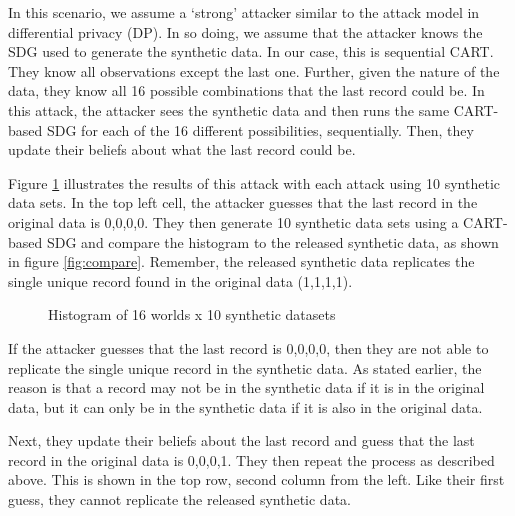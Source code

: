 \documentclass[runningheads]{llncs}
\begin{document}
In this scenario, we assume a `strong' attacker similar to the attack model in differential privacy (DP).  In so doing, we assume that the attacker knows the SDG used to generate the synthetic data.  In our case, this is sequential CART.  They know all observations except the last one.  Further, given the nature of the data, they know all 16 possible combinations that the last record could be.  In this attack, the attacker sees the synthetic data and then runs the same CART-based SDG for each of the 16 different possibilities, sequentially.  Then, they update their beliefs about what the last record could be.

Figure \ref{fig:attacker_default} illustrates the results of this attack with each attack using 10 synthetic data sets.  In the top left cell, the attacker guesses that the last record in the original data is 0,0,0,0.  They then generate 10 synthetic data sets using a CART-based SDG and compare the histogram to the released synthetic data, as shown in figure \ref{fig:compare}.  Remember, the released synthetic data replicates the single unique record found in the original data (1,1,1,1).  

\begin{figure}[!h]
    \centering
    \caption{Histogram of 16 worlds x 10 synthetic datasets}
    \label{fig:attacker_default}
\end{figure}

If the attacker guesses that the last record is 0,0,0,0, then they are not able to replicate the single unique record in the synthetic data.  As stated earlier, the reason is that a record may not be in the synthetic data if it is in the original data, but it can only be in the synthetic data if it is also in the original data. 

Next, they update their beliefs about the last record and guess that the last record in the original data is 0,0,0,1.  They then repeat the process as described above.  This is shown in the top row, second column from the left.  Like their first guess, they cannot replicate the released synthetic data.  
\end{document}
